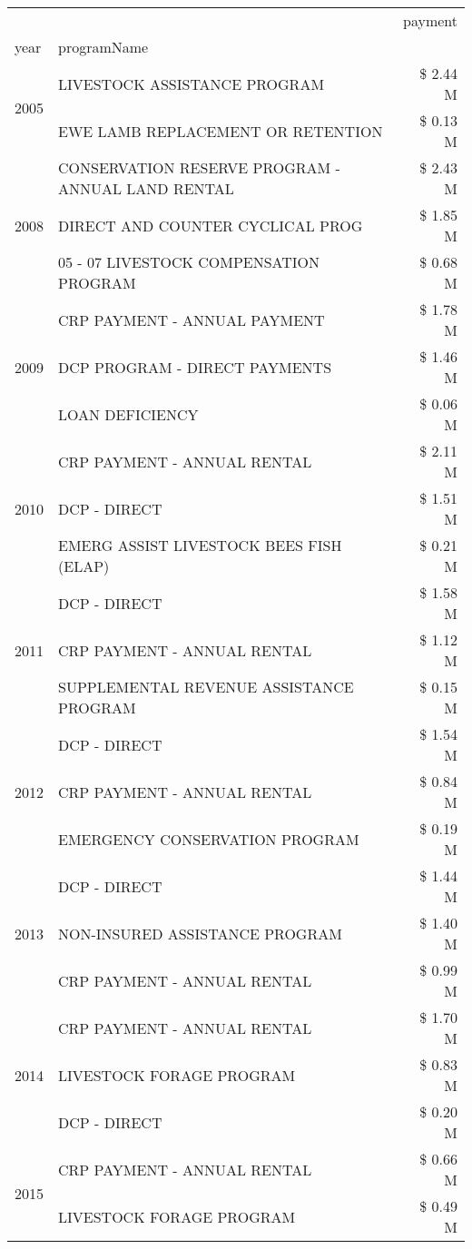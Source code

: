 \begin{tabular}{llr}
\toprule
 &  & payment \\
year & programName &  \\
\midrule
\multirow[t]{2}{*}{2005} & LIVESTOCK ASSISTANCE PROGRAM & \$ 2.44 M \\
 & EWE LAMB REPLACEMENT OR RETENTION & \$ 0.13 M \\
\cline{1-3}
\multirow[t]{3}{*}{2008} & CONSERVATION RESERVE PROGRAM - ANNUAL LAND RENTAL & \$ 2.43 M \\
 & DIRECT AND COUNTER CYCLICAL PROG & \$ 1.85 M \\
 & 05 - 07 LIVESTOCK COMPENSATION PROGRAM & \$ 0.68 M \\
\cline{1-3}
\multirow[t]{3}{*}{2009} & CRP PAYMENT - ANNUAL PAYMENT & \$ 1.78 M \\
 & DCP PROGRAM - DIRECT PAYMENTS & \$ 1.46 M \\
 & LOAN DEFICIENCY & \$ 0.06 M \\
\cline{1-3}
\multirow[t]{3}{*}{2010} & CRP PAYMENT - ANNUAL RENTAL & \$ 2.11 M \\
 & DCP - DIRECT & \$ 1.51 M \\
 & EMERG ASSIST LIVESTOCK BEES FISH (ELAP) & \$ 0.21 M \\
\cline{1-3}
\multirow[t]{3}{*}{2011} & DCP - DIRECT & \$ 1.58 M \\
 & CRP PAYMENT - ANNUAL RENTAL & \$ 1.12 M \\
 & SUPPLEMENTAL REVENUE ASSISTANCE PROGRAM & \$ 0.15 M \\
\cline{1-3}
\multirow[t]{3}{*}{2012} & DCP - DIRECT & \$ 1.54 M \\
 & CRP PAYMENT - ANNUAL RENTAL & \$ 0.84 M \\
 & EMERGENCY CONSERVATION PROGRAM & \$ 0.19 M \\
\cline{1-3}
\multirow[t]{3}{*}{2013} & DCP - DIRECT & \$ 1.44 M \\
 & NON-INSURED ASSISTANCE PROGRAM & \$ 1.40 M \\
 & CRP PAYMENT - ANNUAL RENTAL & \$ 0.99 M \\
\cline{1-3}
\multirow[t]{3}{*}{2014} & CRP PAYMENT - ANNUAL RENTAL & \$ 1.70 M \\
 & LIVESTOCK FORAGE PROGRAM & \$ 0.83 M \\
 & DCP - DIRECT & \$ 0.20 M \\
\cline{1-3}
\multirow[t]{3}{*}{2015} & CRP PAYMENT - ANNUAL RENTAL & \$ 0.66 M \\
 & LIVESTOCK FORAGE PROGRAM & \$ 0.49 M \\

\end{tabular}
